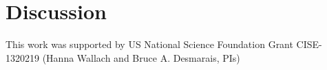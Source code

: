 \documentclass{pnastwo}
\begin{document}
\begin{article}
\begin{figure}[h]
\end{figure}



%
%

%
\section{Discussion}



\begin{acknowledgments}
This work was supported by US National Science Foundation Grant CISE-1320219 (Hanna Wallach and Bruce A. Desmarais, PIs)
\vspace{-.5cm}
\end{acknowledgments}




\end{article}
\end{document}
